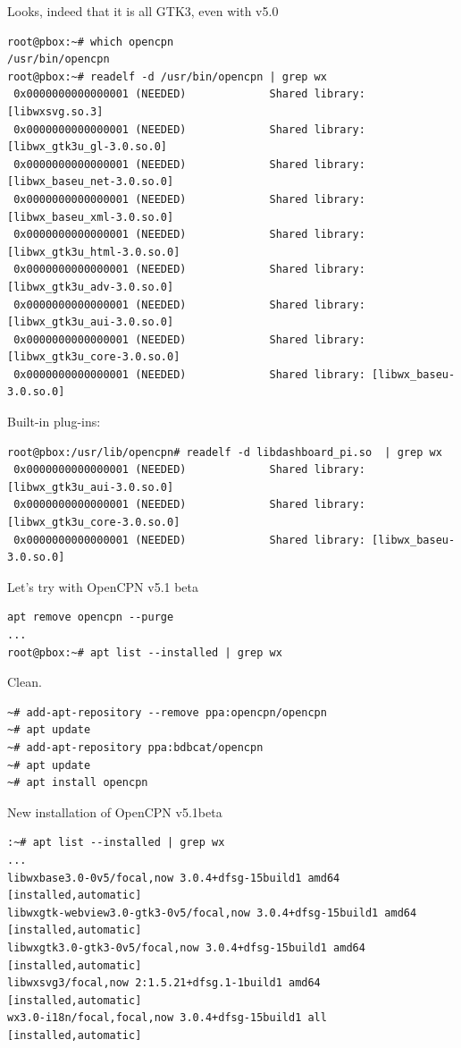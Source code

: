 \documentclass[11pt]{article}
\begin{document}
    Looks, indeed that it is all GTK3, even with v5.0

    \begin{verbatim}
root@pbox:~# which opencpn
/usr/bin/opencpn
root@pbox:~# readelf -d /usr/bin/opencpn | grep wx
 0x0000000000000001 (NEEDED)             Shared library: [libwxsvg.so.3]
 0x0000000000000001 (NEEDED)             Shared library: [libwx_gtk3u_gl-3.0.so.0]
 0x0000000000000001 (NEEDED)             Shared library: [libwx_baseu_net-3.0.so.0]
 0x0000000000000001 (NEEDED)             Shared library: [libwx_baseu_xml-3.0.so.0]
 0x0000000000000001 (NEEDED)             Shared library: [libwx_gtk3u_html-3.0.so.0]
 0x0000000000000001 (NEEDED)             Shared library: [libwx_gtk3u_adv-3.0.so.0]
 0x0000000000000001 (NEEDED)             Shared library: [libwx_gtk3u_aui-3.0.so.0]
 0x0000000000000001 (NEEDED)             Shared library: [libwx_gtk3u_core-3.0.so.0]
 0x0000000000000001 (NEEDED)             Shared library: [libwx_baseu-3.0.so.0]
\end{verbatim}

    Built-in plug-ins:

    \begin{verbatim}
root@pbox:/usr/lib/opencpn# readelf -d libdashboard_pi.so  | grep wx
 0x0000000000000001 (NEEDED)             Shared library: [libwx_gtk3u_aui-3.0.so.0]
 0x0000000000000001 (NEEDED)             Shared library: [libwx_gtk3u_core-3.0.so.0]
 0x0000000000000001 (NEEDED)             Shared library: [libwx_baseu-3.0.so.0]
\end{verbatim}

    Let's try with OpenCPN v5.1 beta

    \begin{verbatim}
apt remove opencpn --purge
...
root@pbox:~# apt list --installed | grep wx
\end{verbatim}

Clean.

    \begin{verbatim}
~# add-apt-repository --remove ppa:opencpn/opencpn
~# apt update
~# add-apt-repository ppa:bdbcat/opencpn
~# apt update
~# apt install opencpn
\end{verbatim}

    New installation of OpenCPN v5.1beta

    \begin{verbatim}
:~# apt list --installed | grep wx
...
libwxbase3.0-0v5/focal,now 3.0.4+dfsg-15build1 amd64 [installed,automatic]
libwxgtk-webview3.0-gtk3-0v5/focal,now 3.0.4+dfsg-15build1 amd64 [installed,automatic]
libwxgtk3.0-gtk3-0v5/focal,now 3.0.4+dfsg-15build1 amd64 [installed,automatic]
libwxsvg3/focal,now 2:1.5.21+dfsg.1-1build1 amd64 [installed,automatic]
wx3.0-i18n/focal,focal,now 3.0.4+dfsg-15build1 all [installed,automatic]
\end{verbatim}
\end{document}
